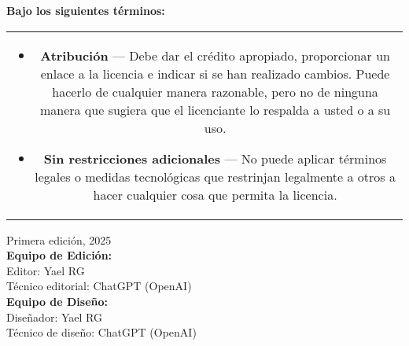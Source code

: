\begin{center}
\textbf{Bajo los siguientes términos:}
\end{center}

\begin{center}
\begin{tabular}{c}
\begin{minipage}{0.9\textwidth}
\begin{itemize}
    \item \textbf{Atribución} — Debe dar el crédito apropiado, proporcionar un enlace a la licencia e indicar si se han realizado cambios. Puede hacerlo de cualquier manera razonable, pero no de ninguna manera que sugiera que el licenciante lo respalda a usted o a su uso.
    \item \textbf{Sin restricciones adicionales} — No puede aplicar términos legales o medidas tecnológicas que restrinjan legalmente a otros a hacer cualquier cosa que permita la licencia.
\end{itemize}
\end{minipage}
\end{tabular}
\end{center}

\begin{center}
{\large Primera edición, 2025} \\[0.5cm]

{\large \textbf{Equipo de Edición:}} \\[0.5cm]
{\large Editor: Yael RG} \\[0.5cm]
{\large Técnico editorial: ChatGPT (OpenAI)} \\[1.0cm]

{\large \textbf{Equipo de Diseño:}} \\[0.5cm]
{\large Diseñador: Yael RG} \\[0.5cm]
{\large Técnico de diseño: ChatGPT (OpenAI)} \\[1.0cm]
\end{center}


\clearpage
\thispagestyle{empty} %

